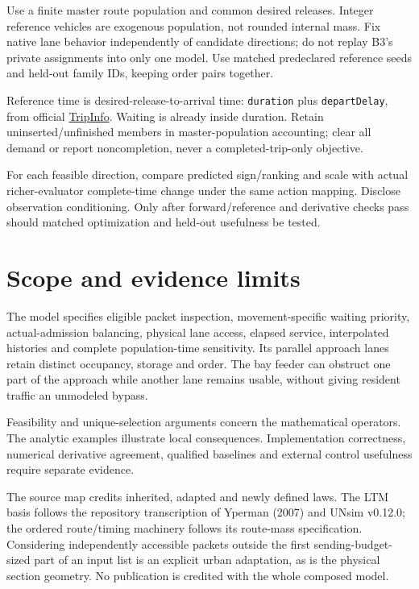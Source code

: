\documentclass[10pt,a4paper]{article}
\begin{document}
Use a finite master route population and common desired releases.
Integer reference vehicles are exogenous population, not rounded internal
mass. Fix native lane behavior independently of candidate directions;
do not replay B3's private assignments into only one model.
Use matched predeclared reference seeds and held-out family IDs,
keeping order pairs together.

Reference time is desired-release-to-arrival time:
\texttt{duration} plus \texttt{departDelay}, from official
\href{https://sumo.dlr.de/docs/Simulation/Output/TripInfo.html}{TripInfo}.
Waiting is already inside duration. Retain uninserted/unfinished members
in master-population accounting; clear all demand or report noncompletion,
never a completed-trip-only objective.

For each feasible direction, compare predicted sign/ranking and scale
with actual richer-evaluator complete-time change under the same action
mapping. Disclose observation conditioning. Only after forward/reference
and derivative checks pass should matched optimization and held-out
usefulness be tested.

\section{Scope and evidence limits}

The model specifies eligible packet inspection, movement-specific waiting
priority, actual-admission balancing, physical lane access, elapsed
service, interpolated histories and complete population-time sensitivity.
Its parallel approach lanes retain distinct occupancy, storage and order.
The bay feeder can obstruct one part of the approach while another lane
remains usable, without giving resident traffic an unmodeled bypass.

Feasibility and unique-selection arguments concern the mathematical
operators. The analytic examples illustrate local consequences.
Implementation correctness, numerical derivative agreement, qualified
baselines and external control usefulness require separate evidence.

The source map credits inherited, adapted and newly defined laws.
The LTM basis follows the repository transcription of Yperman (2007) and
UNsim v0.12.0; the ordered route/timing machinery follows its route-mass
specification. Considering independently accessible packets outside the
first sending-budget-sized part of an input list is an explicit urban
adaptation, as is the physical section geometry. No publication is
credited with the whole composed model.
\end{document}
